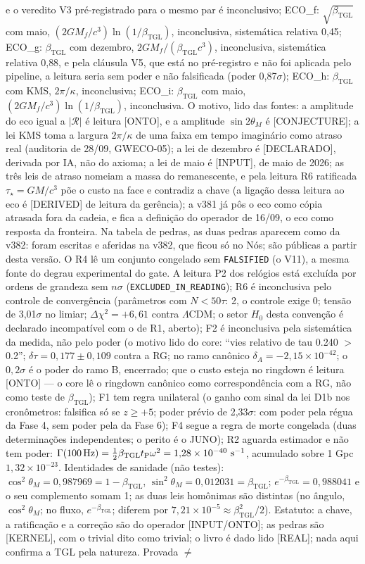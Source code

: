 \documentclass[11pt]{article}
\newcommand{\bTGL}{\beta_{\mathrm{TGL}}}\newcommand{\Msun}{M_{\odot}}\newcommand{\TGL}{\mathrm{TGL}}
\theoremstyle{definition}\newtheorem{deriv}{Derivação}
\begin{document}
e o veredito V3 pré-registrado para o mesmo par é inconclusivo; ECO\_f: $\sqrt{\bTGL}$ com maio, $(2GM_f/c^3)\ln(1/\bTGL)$, inconclusiva, sistemática relativa 0{,}45; ECO\_g: $\bTGL$ com dezembro, $2GM_f/(\bTGL c^3)$, inconclusiva, sistemática relativa 0{,}88, e pela cláusula V5, que está no pré-registro e não foi aplicada pelo pipeline, a leitura seria sem poder e não falsificada (poder 0{,}87$\sigma$); ECO\_h: $\bTGL$ com KMS, $2\pi/\kappa$, inconclusiva; ECO\_i: $\bTGL$ com maio, $(2GM_f/c^3)\ln(1/\bTGL)$, inconclusiva. O motivo, lido das fontes: a amplitude do eco igual a $|\mathcal R|$ é leitura \textsf{[ONTO]}, e a amplitude $\sin 2\theta_M$ é \textsf{[CONJECTURE]}; a lei KMS toma a largura $2\pi/\kappa$ de uma faixa em tempo imaginário como atraso real (auditoria de 28/09, GWECO-05); a lei de dezembro é \textsf{[DECLARADO]}, derivada por IA, não do axioma; a lei de maio é \textsf{[INPUT]}, de maio de 2026; as três leis de atraso nomeiam a massa do remanescente, e pela leitura R6 ratificada $\tau_\star=GM/c^3$ põe o custo na face e contradiz a chave (a ligação dessa leitura ao eco é \textsf{[DERIVED]} de leitura da gerência); a v381 já pôs o eco como cópia atrasada fora da cadeia, e fica a definição do operador de 16/09, o eco como resposta da fronteira. Na tabela de pedras, as duas pedras aparecem como da v382: foram escritas e aferidas na v382, que ficou só no Nós; são públicas a partir desta versão. O R4 lê um conjunto congelado sem \texttt{FALSIFIED} (o V11), a mesma fonte do degrau experimental do gate. A leitura P2 dos relógios está excluída por ordens de grandeza sem $n\sigma$ (\texttt{EXCLUDED\_IN\_READING}); R6 é inconclusiva pelo controle de convergência (parâmetros com $N<50\tau$: 2, o controle exige 0; tensão de 3{,}01$\sigma$ no limiar; $\Delta\chi^2=+6{,}61$ contra $\Lambda$CDM; o setor $H_0$ desta convenção é declarado incompatível com o de R1, aberto); F2 é inconclusiva pela sistemática da medida, não pelo poder (o motivo lido do core: ``vies relativo de tau 0.240 $>$ 0.2''; $\delta\tau=0{,}177\pm0{,}109$ contra a RG; no ramo canônico $\delta_A=-2{,}15\times10^{-42}$; o $0{,}2\sigma$ é o poder do ramo B, encerrado; que o custo esteja no ringdown é leitura \textsf{[ONTO]} --- o core lê o ringdown canônico como correspondência com a RG, não como teste de $\bTGL$); F1 tem regra unilateral (o ganho com sinal da lei D1b nos cronômetros: falsifica só se $z\ge+5$; poder prévio de 2{,}33$\sigma$: com poder pela régua da Fase 4, sem poder pela da Fase 6); F4 segue a regra de morte congelada (duas determinações independentes; o perito é o JUNO); R2 aguarda estimador e não tem poder: $\Gamma(100\,\mathrm{Hz})=\tfrac12\bTGL t_{\rm P}\omega^2=1{,}28\times10^{-40}\ \mathrm{s^{-1}}$, acumulado sobre 1 Gpc $1{,}32\times10^{-23}$. Identidades de sanidade (não testes): $\cos^2\theta_M=0{,}987969=1-\bTGL$, $\sin^2\theta_M=0{,}012031=\bTGL$; $e^{-\bTGL}=0{,}988041$ e o seu complemento somam 1; as duas leis homônimas são distintas (no ângulo, $\cos^2\theta_M$; no fluxo, $e^{-\bTGL}$; diferem por $7{,}21\times10^{-5}\approx\bTGL^2/2$). Estatuto: a chave, a ratificação e a correção são do operador \textsf{[INPUT/ONTO]}; as pedras são \textsf{[KERNEL]}, com o trivial dito como trivial; o livro é dado lido \textsf{[REAL]}; nada aqui confirma a TGL pela natureza. Provada $\neq$ 
\end{document}
